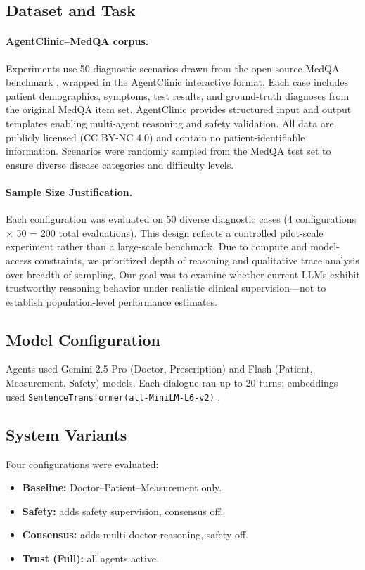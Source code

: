 \documentclass[letterpaper]{article} %
\begin{document}
\subsection{Dataset and Task}
\paragraph{AgentClinic–MedQA corpus.}
Experiments use 50 diagnostic scenarios drawn from the open-source MedQA benchmark \cite{jin2021disease}, wrapped in the AgentClinic interactive format.
Each case includes patient demographics, symptoms, test results, and ground-truth diagnoses from the original MedQA item set.
AgentClinic provides structured input and output templates enabling multi-agent reasoning and safety validation.
All data are publicly licensed (CC BY-NC 4.0) and contain no patient-identifiable information.
Scenarios were randomly sampled from the MedQA test set to ensure diverse disease categories and difficulty levels.

\paragraph{Sample Size Justification.}
Each configuration was evaluated on 50 diverse diagnostic cases (4 configurations × 50 = 200 total evaluations). 
This design reflects a controlled pilot-scale experiment rather than a large-scale benchmark. 
Due to compute and model-access constraints, we prioritized depth of reasoning and qualitative trace analysis over breadth of sampling. 
Our goal was to examine whether current LLMs exhibit trustworthy reasoning behavior under realistic clinical supervision—not to establish population-level performance estimates.


\subsection{Model Configuration}
Agents used Gemini 2.5 Pro (Doctor, Prescription) \cite{gemini2024}and Flash (Patient, Measurement, Safety) \cite{geminiFlash2024} models. Each dialogue ran up to 20 turns; embeddings used \texttt{SentenceTransformer(all-MiniLM-L6-v2)} \cite{reimers2019sentencebert}.

\subsection{System Variants}
Four configurations were evaluated:
\begin{itemize}
    \item \textbf{Baseline:} Doctor–Patient–Measurement only.
    \item \textbf{Safety:} adds safety supervision, consensus off.
    \item \textbf{Consensus:} adds multi-doctor reasoning, safety off.
    \item \textbf{Trust (Full):} all agents active.
\end{itemize}
\end{document}
